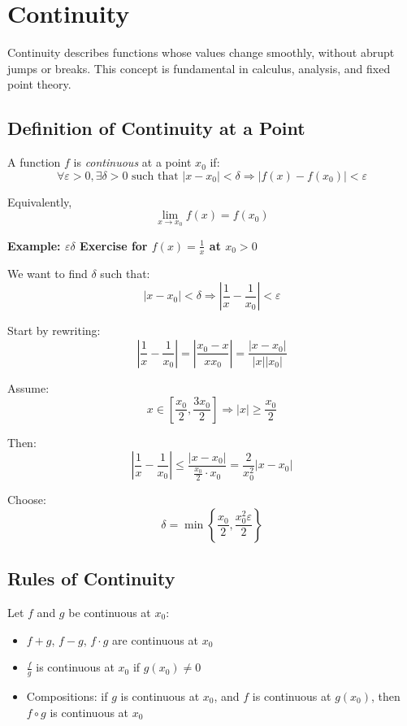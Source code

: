 \newpage
\section{Continuity}

Continuity describes functions whose values change smoothly, without abrupt jumps or breaks. This concept is fundamental in calculus, analysis, and fixed point theory.

\subsection{Definition of Continuity at a Point}

A function \(f\) is \emph{continuous} at a point \(x_0\) if:
\[
\forall \varepsilon > 0, \exists \delta > 0 \text{ such that } |x - x_0| < \delta \Rightarrow |f(x) - f(x_0)| < \varepsilon
\]

Equivalently,
\[
\lim_{x \to x_0} f(x) = f(x_0)
\]

\textbf{Example: \(\varepsilon \delta\) Exercise for \(f(x) = \frac{1}{x}\) at \(x_0 > 0\)}

We want to find \(\delta\) such that:
\[
|x - x_0| < \delta \Rightarrow \left|\frac{1}{x} - \frac{1}{x_0}\right| < \varepsilon
\]

Start by rewriting:
\[
\left|\frac{1}{x} - \frac{1}{x_0}\right| = \left|\frac{x_0 - x}{xx_0}\right| = \frac{|x - x_0|}{|x||x_0|}
\]

Assume:
\[
x \in \left[\frac{x_0}{2}, \frac{3x_0}{2}\right] \Rightarrow |x| \ge \frac{x_0}{2}
\]

Then:
\[
\left|\frac{1}{x} - \frac{1}{x_0}\right| \le \frac{|x - x_0|}{\frac{x_0}{2} \cdot x_0} = \frac{2}{x_0^2} |x - x_0|
\]

Choose:
\[
\delta = \min\left\{\frac{x_0}{2}, \frac{x_0^2 \varepsilon}{2} \right\}
\]

\subsection{Rules of Continuity}

Let \(f\) and \(g\) be continuous at \(x_0\):

\begin{itemize}[label=\(-\)]
\item \(f + g\), \(f - g\), \(f \cdot g\) are continuous at \(x_0\)
\item \(\frac{f}{g}\) is continuous at \(x_0\) if \(g(x_0) \ne 0\)
\item Compositions: if \(g\) is continuous at \(x_0\), and \(f\) is continuous at \(g(x_0)\), then \(f \circ g\) is continuous at \(x_0\)
\end{itemize}

